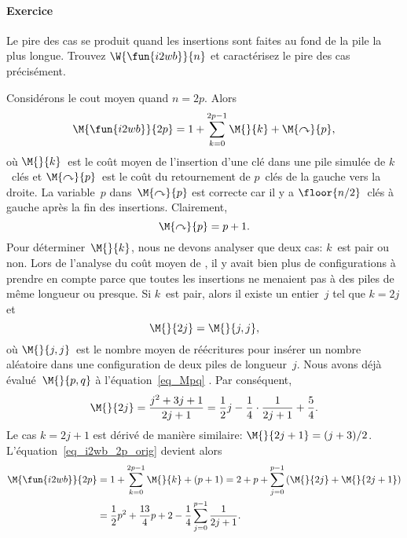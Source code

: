\paragraph{Exercice}

Le pire des cas se produit quand les insertions sont faites au fond de
la pile la plus longue. Trouvez \(\W{\fun{i2wb}}{n}\) et caractérisez
le pire des cas précisément.


Considérons le cout moyen quand \(n=2p\). Alors
\begin{equation}
\M{\fun{i2wb}}{2p} =
  1 + \sum_{k=0}^{2p-1}{\M{}{k}} + \M{\curvearrowright}{p},
\label{eq_i2wb_2p_orig}
\end{equation}
où \(\M{}{k}\)~est le coût moyen de l'insertion d'une clé dans une
pile simulée de \(k\)~clés et
\(\M{\curvearrowright}{p}\)~est
le coût du retournement de \(p\)~clés de la gauche vers la droite. La
variable~\(p\) dans~\(\M{\curvearrowright}{p}\) est correcte car il y
a \(\floor{n/2}\)~clés à gauche après la fin des
insertions. Clairement,
\begin{equation*}
\M{\curvearrowright}{p} = p + 1.
\end{equation*}
Pour déterminer~\(\M{}{k}\), nous ne devons analyser que deux cas:
\(k\)~est pair ou non. Lors de l'analyse du coût moyen de ,
il y avait bien plus de configurations à prendre en compte parce que
toutes les insertions ne menaient pas à des piles de même longueur ou
presque. Si \(k\)~est pair, alors il existe un entier~\(j\) tel que
\(k=2j\) et
\begin{equation*}
\M{}{2j} = \M{}{j,j},
\end{equation*}
où \(\M{}{j,j}\)~est le nombre moyen de réécritures pour insérer un
nombre aléatoire dans une configuration de deux piles de
longueur~\(j\). Nous avons déjà évalué~\(\M{}{p,q}\) à
l'équation~\eqref{eq_Mpq} . Par conséquent,
\begin{equation*}
\M{}{2j} = \frac{j^2 + 3j + 1}{2j+1}
         = \frac{1}{2}{j} - \frac{1}{4} \cdot \frac{1}{2j+1} +
         \frac{5}{4}.
\end{equation*}
Le cas \(k=2j+1\) est dérivé de manière similaire: \(\M{}{2j+1} =
(j+3)/2\). L'équation~\eqref{eq_i2wb_2p_orig} devient alors
\begin{align}
\M{\fun{i2wb}}{2p}
  &= 1 + \sum_{k=0}^{2p-1}{\M{}{k}} + (p+1)
   = 2 + p + \sum_{j=0}^{p-1}{(\M{}{2j} + \M{}{2j+1})}\notag\\
  &= \frac{1}{2}{p^2} + \frac{13}{4}{p} + 2 -
             \frac{1}{4}\sum_{j=0}^{p-1}{\frac{1}{2j+1}}.
\label{eq_i2wb_2p}
\end{align}
